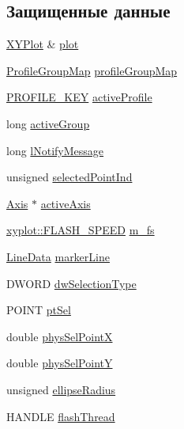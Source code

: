 \subsection*{Защищенные данные}
\begin{DoxyCompactItemize}
\item 
\hyperlink{class_x_y_plot}{X\-Y\-Plot} \& \hyperlink{class_selection_a5446aca339af493b9853e1d8791747ee}{plot}
\item 
\hyperlink{class_profile_group_map}{Profile\-Group\-Map} \hyperlink{class_selection_a9969ae2dd3dfc1de2ff22851f23ca701}{profile\-Group\-Map}
\item 
\hyperlink{profile_8h_ab564cd67657a739c9e5a6caa0ce0dafa}{P\-R\-O\-F\-I\-L\-E\-\_\-\-K\-E\-Y} \hyperlink{class_selection_aad8ed405574d4eaa7c71ea6ab74f921f}{active\-Profile}
\item 
long \hyperlink{class_selection_a3f157e54d3bf571bb58f0ab278311d1f}{active\-Group}
\item 
long \hyperlink{class_selection_ae2e8fd632fbdf5ad8222271d861dee3e}{l\-Notify\-Message}
\item 
unsigned \hyperlink{class_selection_aae0adc2fbecf906fe191f37db02865d9}{selected\-Point\-Ind}
\item 
\hyperlink{class_axis}{Axis} $\ast$ \hyperlink{class_selection_a0e9d894fc2d3922fa13b9bab29c0868b}{active\-Axis}
\item 
\hyperlink{namespacexyplot_aef2fa49b82f49b1152511044149c60bb}{xyplot\-::\-F\-L\-A\-S\-H\-\_\-\-S\-P\-E\-E\-D} \hyperlink{class_selection_ae8158cf33f08749711665081d33a5eee}{m\-\_\-fs}
\item 
\hyperlink{class_line_data}{Line\-Data} \hyperlink{class_selection_a931c1dc1ae09a247eddb870ae860258e}{marker\-Line}
\item 
D\-W\-O\-R\-D \hyperlink{class_selection_abcefb6532a3336dbdb704524ca603f09}{dw\-Selection\-Type}
\item 
P\-O\-I\-N\-T \hyperlink{class_selection_a2ba4d3b1be1be25852a81ae8d8b85464}{pt\-Sel}
\item 
double \hyperlink{class_selection_a55bbd4862d833205e258d2a51256e161}{phys\-Sel\-Point\-X}
\item 
double \hyperlink{class_selection_ae34c8ddfe73abfaaeec3b99bb649f802}{phys\-Sel\-Point\-Y}
\item 
unsigned \hyperlink{class_selection_afe67da14987a0c10aa1f401b4a8210f6}{ellipse\-Radius}
\item 
H\-A\-N\-D\-L\-E \hyperlink{class_selection_aed45afe1b41abebe3f7d22d8b5574ad3}{flash\-Thread}

\end{DoxyCompactItemize}
